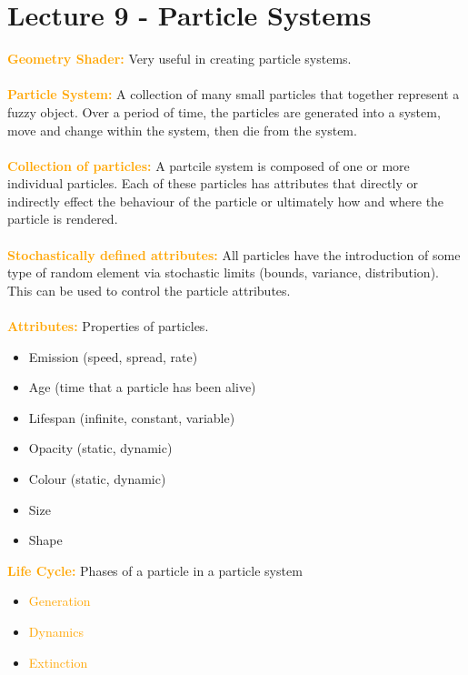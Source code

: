 \documentclass[a4paper,10pt]{article}
\begin{document}
\section*{Lecture 9 - Particle Systems}
\textcolor{Orange}{\textbf{Geometry Shader:}} Very useful in creating particle systems. \\\\
\textcolor{Orange}{\textbf{Particle System:}} A collection of many small particles that together represent a fuzzy object. Over a period of time, the particles are generated into a system, move and change within the system, then die from the system. \\\\
\textcolor{Orange}{\textbf{Collection of particles:}} A partcile system is composed of one or more individual particles. Each of these particles has attributes that directly or indirectly effect the behaviour of the particle or ultimately how and where the particle is rendered. \\\\
\textcolor{Orange}{\textbf{Stochastically defined attributes:}} All particles have the introduction of some type of random element via stochastic limits (bounds, variance, distribution). This can be used to control the particle attributes. \\\\
\newpage
\textcolor{Orange}{\textbf{Attributes:}} Properties of particles.
\renewcommand{\labelitemi}{\textperiodcentered}
\begin{itemize}
\item Emission (speed, spread, rate)
\item Age (time that a particle has been alive)
\item Lifespan (infinite, constant, variable)
\item Opacity (static, dynamic)
\item Colour (static, dynamic)
\item Size 
\item Shape
\end{itemize}
\textcolor{Orange}{\textbf{Life Cycle:}} Phases of a particle in a particle system
\renewcommand{\labelitemi}{\textperiodcentered}
\begin{itemize}
\item \textcolor{Orange}{Generation} 
\item \textcolor{Orange}{Dynamics} 
\item \textcolor{Orange}{Extinction} 
\end{itemize}
\end{document}
